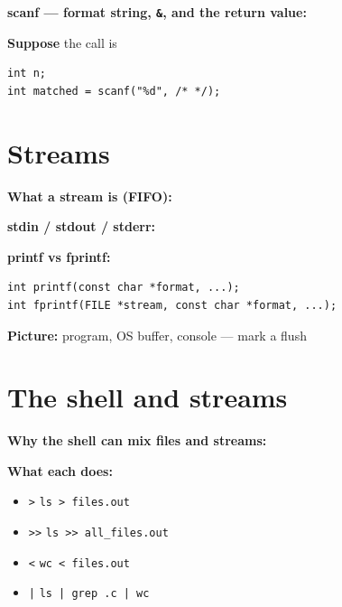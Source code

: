 \documentclass[12pt]{article}
\begin{document}
\Needspace{0.40\textheight}
\noindent\textbf{scanf --- format string, \texttt{\&}, and the return value:}
\vspace{0.26\textheight}

\Needspace{0.24\textheight}
\noindent\textbf{Suppose} the call is
\begin{lstlisting}
int n;
int matched = scanf("%d", /* */);
\end{lstlisting}
\vspace{0.12\textheight}

\newpage
\section*{Streams}

\Needspace{0.24\textheight}
\noindent\textbf{What a stream is (FIFO):}
\vspace{0.16\textheight}

\Needspace{0.34\textheight}
\noindent\textbf{stdin / stdout / stderr:}
\vspace{0.24\textheight}

\Needspace{0.32\textheight}
\noindent\textbf{printf vs fprintf:}
\vspace{0.14\textheight}

\begin{lstlisting}
int printf(const char *format, ...);
int fprintf(FILE *stream, const char *format, ...);
\end{lstlisting}

\newpage
\Needspace{0.55\textheight}
\noindent\textbf{Picture:} program, OS buffer, console --- mark a flush
\begin{framed}
\begin{minipage}[t][0.44\textheight]{\textwidth}
\vspace{0.4em}
\end{minipage}
\end{framed}

\newpage
\section*{The shell and streams}

\Needspace{0.32\textheight}
\noindent\textbf{Why the shell can mix files and streams:}
\vspace{0.22\textheight}

\Needspace{0.36\textheight}
\noindent\textbf{What each does:}
\begin{itemize}[leftmargin=*]
  \item \texttt{>} \quad \texttt{ls > files.out}
  \item \texttt{>>} \quad \texttt{ls >> all\_files.out}
  \item \texttt{<} \quad \texttt{wc < files.out}
  \item \texttt{|} \quad \texttt{ls | grep .c | wc}
\end{itemize}
\vspace{0.22\textheight}
\end{document}
